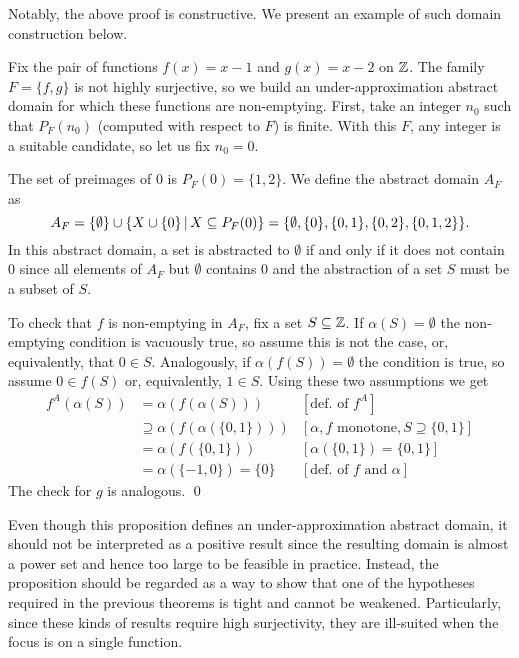 Notably, the above proof is constructive. We present an example of such domain construction below.
\begin{example}\label{ex:uai:construction-ne-domain-base}
	Fix the pair of functions $f(x) = x - 1$ and $g(x) = x - 2$ on $\mathbb{Z}$. The family $F = \{ f, g \}$ is not highly surjective, so we build an under-approximation abstract domain for which these functions are non-emptying.
	First, take an integer $n_0$ such that $P_F(n_0)$ (computed with respect to $F$) is finite. With this $F$, any integer is a suitable candidate, so let us fix $n_0 = 0$.

	The set of preimages of $0$ is $P_F(0) = \{ 1, 2 \}$. We define the abstract domain $A_F$ as
	\[
	A_F = \{ \emptyset \} \cup \left\lbrace X \cup \{ 0 \} \,\vert\, X \subseteq P_F(0) \right\rbrace = \{ \emptyset, \{ 0 \}, \{ 0, 1 \}, \{ 0, 2 \}, \{ 0, 1, 2 \} \} .
	\]
	In this abstract domain, a set is abstracted to $\emptyset$ if and only if it does not contain $0$ since all elements of $A_F$ but $\emptyset$ contains $0$ and the abstraction of a set $S$ must be a subset of $S$.

	To check that $f$ is non-emptying in $A_F$, fix a set $S \subseteq \mathbb{Z}$. If $\alpha(S) = \emptyset$ the non-emptying condition is vacuously true, so assume this is not the case, or, equivalently, that $0 \in S$. Analogously, if $\alpha(f(S)) = \emptyset$ the condition is true, so assume $0 \in f(S)$ or, equivalently, $1 \in S$. Using these two assumptions we get
	\begin{align*}
		f^{A}(\alpha(S)) & = \alpha(f(\alpha(S)))                  & [\text{def. of }f^{A}]                             \\
		                 & \supseteq \alpha(f(\alpha(\{ 0, 1 \}))) & [\alpha, f \text{ monotone}, S \supseteq \{0, 1\}] \\
		                 & = \alpha(f(\{ 0, 1 \}))                 & [\alpha(\{ 0, 1 \}) = \{ 0, 1 \}]                  \\
		                 & = \alpha(\{ -1, 0 \}) = \{ 0 \}         & [\text{def. of } f \text{ and } \alpha]
	\end{align*}
	The check for $g$ is analogous.
	\qed
\end{example}
Even though this proposition defines an under-approximation abstract domain, it should not be interpreted as a positive result since the resulting domain is almost a power set and hence too large to be feasible in practice. Instead, the proposition should be regarded as a way to show that one of the hypotheses required in the previous theorems is tight and cannot be weakened. Particularly, since these kinds of results require high surjectivity, they are ill-suited when the focus is on a single function.

